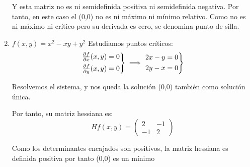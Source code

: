 \begin{ejer}
\begin{enumerate}
	Y esta matriz no es ni semidefinida positiva ni semidefinida negativa. Por tanto, en este caso el (0,0) no es ni máximo ni mínimo relativo.
	Como no es ni máximo ni crítico pero su derivada es cero, se denomina punto de silla.

	\item $f(x,y)=x^2-xy+y^2$ Estudiamos puntos críticos:
	\[
	\begin{rcases}
	\frac{\partial f}{\partial x}(x,y) = 0\\
	\frac{\partial f}{\partial y}(x,y) = 0
\end{rcases} \implies \begin{rcases}
	2x -y= 0\\
	2y-x = 0\\
\end{rcases}
	\]

	Resolvemos el sistema, y nos queda la solución (0,0) también como solución única.

	Por tanto, su matriz hessiana es:
		\[
	Hf(x,y) = \begin{pmatrix} 2 & -1 \\ -1 & 2 \end{pmatrix}
	\]

	Como los determinantes encajados son positivos, la matriz hessiana es definida positiva por tanto (0,0) es un mínimo


\end{enumerate}
\end{ejer}


